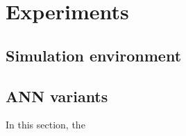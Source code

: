 \chapter{Experiments}
\label{maintwo}

\section{Simulation environment}








\section{ANN variants}

In this section, the 





\section{}